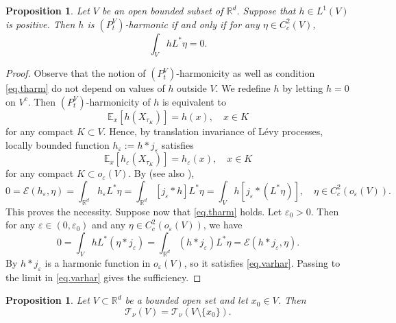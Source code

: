 \documentclass[11pt,a4paper,reqno]{amsart}
\newcommand{\EE}{{\mathcal  E}}
\newtheorem{proposition}[theorem]{\bf Proposition}
\theoremstyle{definition}
\numberwithin{equation}{section}
\begin{document}
\begin{proposition}
\label{prop.harm}
Let $V$ be an open bounded subset of $\mathbb R^d$. 
Suppose that $h\in L^1(V)$ is  positive.
Then $h$  is   $(P^V_t)$-harmonic  if and only if  for any $\eta\in C^2_c(V)$,
\begin{equation}
\label{eq.tharm}
\int_{V}hL^*\eta=0.
\end{equation}
\end{proposition}
\begin{proof}
Observe  that the notion of  $(P^V_t)$-harmonicity  as well as condition \eqref{eq.tharm} do not depend on values of $h$
outside $V$. We redefine $h$ by letting $h=0$ on $V^c$. Then  $(P^V_t)$-harmonicity of $h$ is equivalent to 
\[
\mathbb E_x[h(X_{\tau_K})]=h(x),\quad x\in K
\]
for any compact $K\subset V$. Hence, by translation invariance of L\'evy processes, locally bounded function  $h_\varepsilon :=h\ast j_\varepsilon$
satisfies
\begin{equation}
\label{eq.varhar}
\mathbb E_x[h_\varepsilon(X_{\tau_K})]=h_\varepsilon(x),\quad x\in K
\end{equation}
for any compact $K\subset o_\varepsilon(V)$. By \cite[Theorem 2.18]{MZZ} (see also \cite[Theorem 2.9]{Chen}),
\[
0=\EE(h_\varepsilon,\eta)=\int_{\mathbb R^d}h_\varepsilon L^*\eta=\int_{\mathbb R^d} [j_\varepsilon\ast h] L^*\eta=
\int_{V} h [j_\varepsilon\ast(L^*\eta)]
,\quad \eta\in C^2_c(o_\varepsilon(V)).
\]
This proves the necessity. Suppose now that \eqref{eq.tharm} holds. Let $\varepsilon_0>0$.
Then for any $\varepsilon\in (0,\varepsilon_0)$ and any $\eta\in C_c^2(o_\varepsilon(V))$, we have
\begin{equation}
\label{eq.tharmeps}
0=\int_{V}hL^*(\eta\ast j_\varepsilon)=\int_{\mathbb R^d}(h\ast j_\varepsilon) L^*\eta=\mathcal E(h\ast j_\varepsilon,\eta).
\end{equation}
By \cite{MZZ} $h\ast j_\varepsilon$ is a harmonic function in $o_\varepsilon(V)$, so it satisfies \eqref{eq.varhar}. 
Passing to the limit in \eqref{eq.varhar} gives the sufficiency.  
\end{proof}


\begin{proposition}
\label{prop.punctured-T}
Let $V\subset\mathbb R^d$ be a bounded open set and let $x_0\in V$.
Then
\[
\mathscr T_\nu(V)
=
\mathscr T_\nu(V\setminus\{x_0\}).
\]
\end{proposition}
\end{document}

